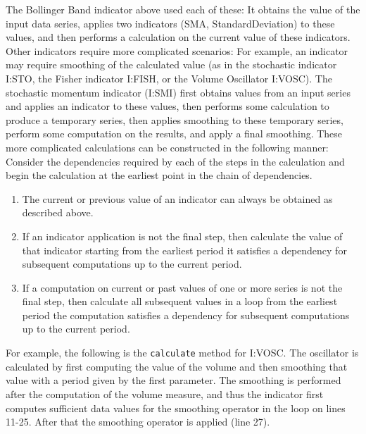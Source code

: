 \documentclass[11pt,twoside]{article}
\begin{document}
The Bollinger Band indicator above used each of these: It obtains the
value of the input data series, applies two indicators (SMA,
StandardDeviation) to these values, and then performs a calculation on
the current value of these indicators. Other indicators require more
complicated scenarios: For example, an indicator may require smoothing
of the calculated value (as in the stochastic indicator I:STO, the
Fisher indicator I:FISH, or the Volume Oscillator I:VOSC). The
stochastic momentum indicator (I:SMI) first obtains values from an
input series and applies an indicator to these values, then performs
some calculation to produce a temporary series, then applies smoothing
to these temporary series, perform some computation on the results, and
apply a final smoothing. These more complicated calculations can be
constructed in the following manner: Consider the dependencies required
by each of the steps in the calculation and begin the calculation at
the earliest point in the chain of dependencies.

\begin{enumerate}
\item The current or previous value of an indicator can always be obtained
as described above.
\item If an indicator application is not the final step, then calculate the
value of that indicator starting from the earliest period it satisfies
a dependency for subsequent computations up to the current period.
\item If a computation on current or past values of one or more series is
not the final step, then calculate all subsequent values in a loop from
the earliest period the computation satisfies a dependency for
subsequent computations up to the current period.
\end{enumerate}

For example, the following is the \lstinline!calculate! method
for I:VOSC. The oscillator is calculated by first computing the value
of the volume and then smoothing that value with a period given by the
first parameter. The smoothing is performed after the computation of
the volume measure, and thus the indicator first computes sufficient
data values for the smoothing operator in the loop on lines 11-25.
After that the smoothing operator is applied (line 27).
\end{document}
